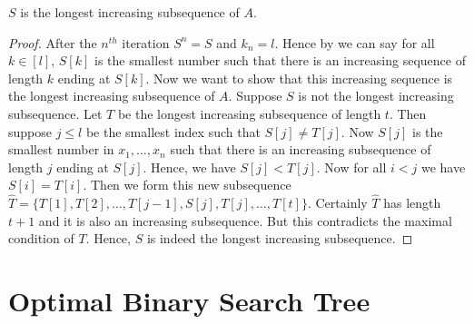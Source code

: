 \begin{Theorem}{}{}
	$S$ is the longest increasing subsequence of $A$.
\end{Theorem}
\begin{proof}
	After the $n^{th}$ iteration $S^n=S$ and $k_n=l$. Hence by  we can say for all $k\in[l]$, $S[k]$ is the smallest number such that there is an increasing sequence of length $k$ ending at $S[k]$. Now we want to show that this increasing sequence is the longest increasing subsequence of $A$. Suppose $S$ is not the longest increasing subsequence. Let $T$ be the longest increasing subsequence of length $t$. Then suppose $j\leq l$ be the smallest index such that $S[j]\neq T[j]$. Now $S[j]$ is the smallest number in $x_1,\dots, x_n$ such that there is an increasing subsequence of length $j$ ending at $S[j]$. Hence, we have $S[j]<T[j]$. Now for all $i<j$ we have $S[i]=T[i]$.   Then we form this new subsequence $\hat{T}=\{T[1],T[2],\dots, T[j-1], S[j],T[j],\dots, T[t]\}$. Certainly $\hat{T}$ has length $t+1$ and it is also an increasing subsequence. But this contradicts the maximal condition of $T$. Hence, $S$ is indeed the longest increasing subsequence.
\end{proof}

\section{Optimal Binary Search Tree}
\begin{algoprob}
\end{algoprob}

